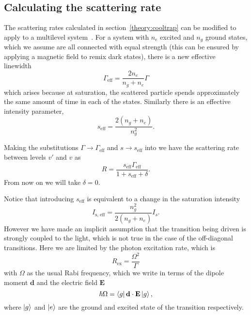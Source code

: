 \subsection{Calculating the scattering rate}

The scattering rates calculated in section~\ref{theory:cooltrap} can be modified to
apply to a multilevel system~\cite{Metcalf1999}. For a system with $n_e$
excited and $n_g$ ground states, which we assume are all connected with equal
strength (this can be ensured by applying a magnetic field to remix dark
states), there is a new effective linewidth~\cite{Williams2017}
%
\begin{equation}
  \Gamma_\text{eff} = \frac{2n_e}{n_g + n_e}\Gamma
\end{equation}
%
which arises because at saturation, the scattered particle spends approximately
the same amount of time in each of the states. Similarly there is an effective
intensity parameter,
%
\begin{equation}
  s_\text{eff} = \frac{2(n_g + n_e)}{n_g^2}.
\end{equation}
%

Making the substitutions $\Gamma\rightarrow\Gamma_\text{eff}$ and $s\rightarrow
s_\text{eff}$ into  we have the scattering
rate between levels $v'$ and $v$ as
%
\begin{equation}
  R = \frac{s_\text{eff}\Gamma_\text{eff}}{1 + s_\text{eff} + \delta}.
\end{equation}
%
From now on we will take $\delta = 0$.

Notice that introducing $s_\text{eff}$ is equivalent to a change in the
saturation intensity
%
\begin{equation}
  I_\text{s, eff} = \frac{n_g^2}{2(n_g + n_e)}I_s.
\end{equation}
%
However we have made an implicit assumption that the transition being driven is
strongly coupled to the light, which is not true in the case of the
off-diagonal transitions. Here we are limited by the photon excitation rate,
which is
%
\begin{equation}
  R_\text{ex} = \frac{\Omega^2}{\Gamma}
\end{equation}
%
with $\Omega$ as the usual Rabi frequency, which we write in terms of the
dipole moment $\mathbf{d}$ and the electric field $\mathbf{E}$
%
\begin{equation}
  \hbar \Omega = \bra{g}\mathbf{d}\cdot\mathbf{E}\ket{g},
\end{equation}
%
where $\ket{g}$ and $\ket{e}$ are the ground and excited state of the
transition respectively.

